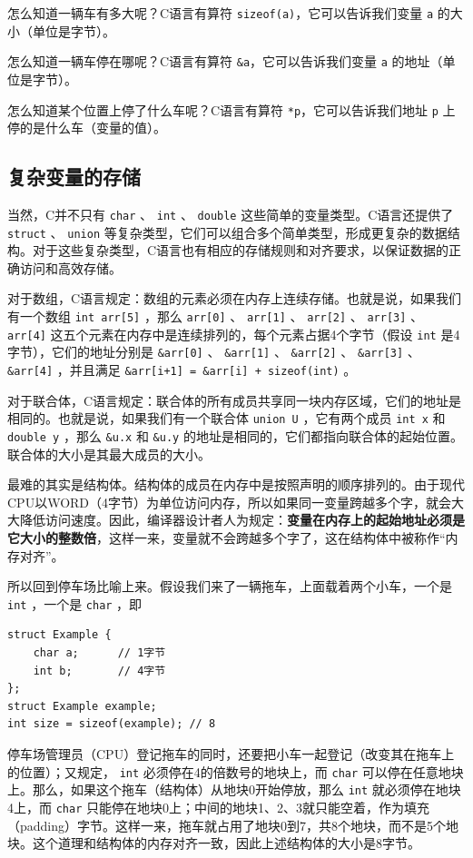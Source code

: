 怎么知道一辆车有多大呢？C语言有算符 \texttt{sizeof(a)}，它可以告诉我们变量 \texttt{a} 的大小（单位是字节）。

怎么知道一辆车停在哪呢？C语言有算符 \texttt{&a}，它可以告诉我们变量 \texttt{a} 的地址（单位是字节）。

怎么知道某个位置上停了什么车呢？C语言有算符 \texttt{*p}，它可以告诉我们地址 \texttt{p} 上停的是什么车（变量的值）。

\subsection{复杂变量的存储}

当然，C并不只有 \verb|char| 、 \verb|int| 、 \verb|double| 这些简单的变量类型。C语言还提供了 \verb|struct| 、 \verb|union| 等复杂类型，它们可以组合多个简单类型，形成更复杂的数据结构。对于这些复杂类型，C语言也有相应的存储规则和对齐要求，以保证数据的正确访问和高效存储。

对于数组，C语言规定：数组的元素必须在内存上连续存储。也就是说，如果我们有一个数组 \verb|int arr[5]| ，那么 \verb|arr[0]| 、 \verb|arr[1]| 、 \verb|arr[2]| 、 \verb|arr[3]| 、 \verb|arr[4]| 这五个元素在内存中是连续排列的，每个元素占据4个字节（假设 \verb|int| 是4字节），它们的地址分别是 \verb|&arr[0]| 、 \verb|&arr[1]| 、 \verb|&arr[2]| 、 \verb|&arr[3]| 、 \verb|&arr[4]| ，并且满足 \verb|&arr[i+1] = &arr[i] + sizeof(int)| 。

对于联合体，C语言规定：联合体的所有成员共享同一块内存区域，它们的地址是相同的。也就是说，如果我们有一个联合体 \verb|union U| ，它有两个成员 \verb|int x| 和 \verb|double y| ，那么 \verb|&u.x| 和 \verb|&u.y| 的地址是相同的，它们都指向联合体的起始位置。联合体的大小是其最大成员的大小。

最难的其实是结构体。结构体的成员在内存中是按照声明的顺序排列的。由于现代CPU以WORD（4字节）为单位访问内存，所以如果同一变量跨越多个字，就会大大降低访问速度。因此，编译器设计者人为规定：\textbf{变量在内存上的起始地址必须是它大小的整数倍}，这样一来，变量就不会跨越多个字了，这在结构体中被称作“内存对齐”。

所以回到停车场比喻上来。假设我们来了一辆拖车，上面载着两个小车，一个是 \verb|int| ，一个是 \verb|char| ，即
\begin{verbatim}
struct Example {
    char a;      // 1字节
    int b;       // 4字节
};
struct Example example;
int size = sizeof(example); // 8
\end{verbatim}
停车场管理员（CPU）登记拖车的同时，还要把小车一起登记（改变其在拖车上的位置）；又规定， \verb|int| 必须停在4的倍数号的地块上，而 \verb|char| 可以停在任意地块上。那么，如果这个拖车（结构体）从地块0开始停放，那么 \verb|int| 就必须停在地块4上，而 \verb|char| 只能停在地块0上；中间的地块1、2、3就只能空着，作为填充（padding）字节。这样一来，拖车就占用了地块0到7，共8个地块，而不是5个地块。这个道理和结构体的内存对齐一致，因此上述结构体的大小是8字节。

